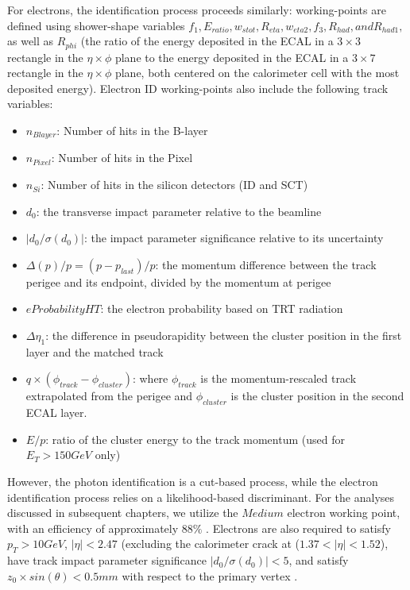 For electrons, the identification process proceeds similarly: working-points are defined using shower-shape variables $f_{1}, E_{ratio}, w_{s tot}, R_{eta}, w_{eta2}, f_{3}, R_{had}, and R_{had1},$ as well as $R_{phi}$ (the ratio of the energy deposited in the ECAL in a $3 \times 3$ rectangle in the $\eta \times \phi$ plane to the energy deposited in the ECAL in a $3 \times 7$ rectangle in the $\eta \times \phi$ plane, both centered on the calorimeter cell with the most deposited energy). Electron ID working-points also include the following track variables:
\begin{itemize}
\item $n_{Blayer}$: Number of hits in the B-layer
\item $n_{Pixel}$: Number of hits in the Pixel
\item $n_{Si}$: Number of hits in the silicon detectors (ID and SCT)
\item $d_{0}$: the transverse impact parameter relative to the beamline
\item $|d_{0} / \sigma(d_{0})|$: the impact parameter significance relative to its uncertainty
\item $\Delta(p)/p = (p-p_{last})/p$: the momentum difference between the track perigee and its endpoint, divided by the momentum at perigee
\item $eProbabilityHT$: the electron probability based on TRT radiation
\item $\Delta \eta_{1}$: the difference in pseudorapidity between the cluster position in the first layer and the matched track
\item $q \times (\phi_{track}-\phi_{cluster})$: where $\phi_{track}$ is the momentum-rescaled track extrapolated from the perigee and $\phi_{cluster}$ is the cluster position in the second ECAL layer.
\item $E/p$: ratio of the cluster energy to the track momentum (used for $E_{T} > 150 GeV$ only) 
\end{itemize}

However, the photon identification is a cut-based process, while the electron identification process relies on a likelihood-based discriminant. For the analyses discussed in subsequent chapters, we utilize the $Medium$ electron working point, with an efficiency of approximately 88$\%$ \cite{elID-CERN-EP-2018-273}. Electrons are also required to satisfy $p_{T} > 10 GeV$, $|\eta| < 2.47$ (excluding the calorimeter crack at ($1.37<|\eta|<1.52$), have track impact parameter significance $|d_{0} / \sigma(d_{0})| < 5$, and satisfy $z_{0} \times sin(\theta) < 0.5 mm$ with respect to the primary vertex \cite{ATL-COM-PHYS-2020-378}.

